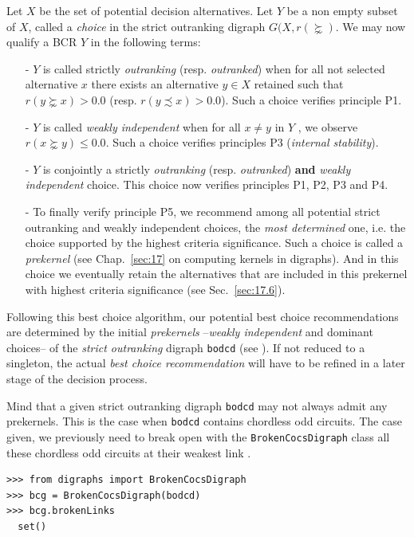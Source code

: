 Let $X$ be the set of potential decision alternatives. Let $Y$ be a non empty subset of $X$, called a \emph{choice} in the strict outranking digraph $G(X,r(\succnsim )$. We may now qualify a BCR $Y$ in the following terms:
\begin{itemize}[leftmargin=0.5cm,listparindent=0em]
\item [-] $Y$ is called strictly \emph{outranking} (resp. \emph{outranked}) when for all not selected alternative $x$ there exists an alternative $y \in X$ retained such that $r(y \succnsim x) > 0.0$ (resp. $r(y \precsim x) > 0.0$). Such a choice verifies principle P1.
\item [-] $Y$ is called \emph{weakly independent} when for all $x \neq y$ in $Y$ , we observe $r(x \succnsim y) \leq 0.0$. Such a choice verifies principles P3 (\emph{internal stability}).
\item [-] $Y$ is conjointly a strictly \emph{outranking} (resp. \emph{outranked}) \textbf{and} \emph{weakly independent} choice. This choice now verifies principles P1, P2, P3 and P4.
\item [-] To finally verify principle P5, we recommend among all potential strict outranking and weakly independent choices, the \emph{most determined} one, i.e. the choice supported by the highest criteria significance. Such a choice is called a \emph{prekernel} (see Chap.~\ref{sec:17} on computing kernels in digraphs). And in this choice we eventually retain the alternatives that are included in this prekernel with highest criteria significance (see Sec.~\ref{sec:17.6}).
\end{itemize}

Following this best choice algorithm, our potential best choice recommendations are determined by the initial \emph{prekernels} --\emph{weakly independent} and dominant choices-- of the \emph{strict outranking} digraph \texttt{bodcd} (see \citealp{BIS-2008a}). If not reduced to a singleton, the actual \emph{best choice recommendation} will have to be refined in a later stage of the decision process.

Mind that a given strict outranking digraph \texttt{bodcd} may not always admit any prekernels. This is the case when \texttt{bodcd} contains chordless odd circuits. The case given, we previously need to break open with the \texttt{BrokenCocsDigraph} class all these chordless odd circuits at their weakest link \citep{BIS-2021b}.
\begin{lstlisting}
>>> from digraphs import BrokenCocsDigraph
>>> bcg = BrokenCocsDigraph(bodcd)
>>> bcg.brokenLinks
  set()
\end{lstlisting}

